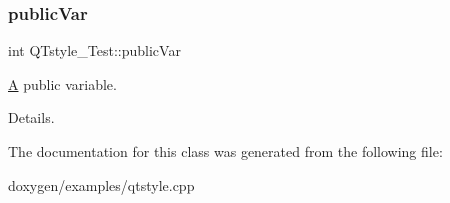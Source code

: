 \subsubsection{\texorpdfstring{publicVar}{publicVar}}
{\footnotesize\ttfamily int Q\+Tstyle\+\_\+\+Test\+::public\+Var}



\mbox{\hyperlink{class_a}{A}} public variable. 

Details. 

The documentation for this class was generated from the following file\+:\begin{DoxyCompactItemize}
\item 
doxygen/examples/qtstyle.\+cpp\end{DoxyCompactItemize}
